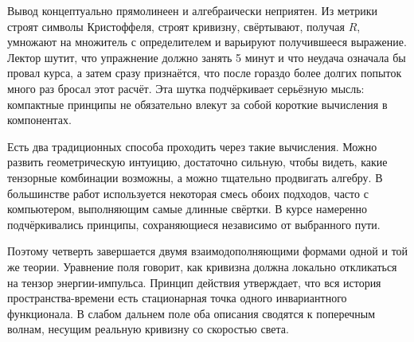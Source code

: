Вывод концептуально прямолинеен и алгебраически неприятен. Из метрики строят символы Кристоффеля, строят кривизну, свёртывают, получая \(R\), умножают на множитель с определителем и варьируют получившееся выражение. Лектор шутит, что упражнение должно занять 5 минут и что неудача означала бы провал курса, а затем сразу признаётся, что после гораздо более долгих попыток много раз бросал этот расчёт. Эта шутка подчёркивает серьёзную мысль: компактные принципы не обязательно влекут за собой короткие вычисления в компонентах.

\begin{classroomqa}
\end{classroomqa}

Есть два традиционных способа проходить через такие вычисления. Можно развить геометрическую интуицию, достаточно сильную, чтобы видеть, какие тензорные комбинации возможны, а можно тщательно продвигать алгебру. В большинстве работ используется некоторая смесь обоих подходов, часто с компьютером, выполняющим самые длинные свёртки. В курсе намеренно подчёркивались принципы, сохраняющиеся независимо от выбранного пути.

\begin{classroomqa}
\end{classroomqa}

Поэтому четверть завершается двумя взаимодополняющими формами одной и той же теории. Уравнение поля говорит, как кривизна должна локально откликаться на тензор энергии-импульса. Принцип действия утверждает, что вся история пространства-времени есть стационарная точка одного инвариантного функционала. В слабом дальнем поле оба описания сводятся к поперечным волнам, несущим реальную кривизну со скоростью света.